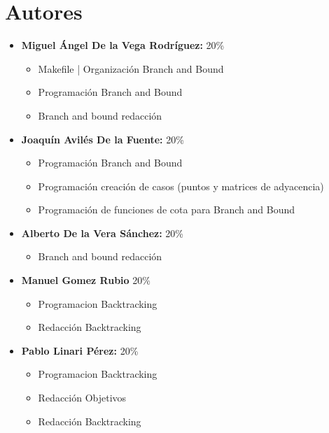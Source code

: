 \documentclass[11pt,openany]{book}
\begin{document}
\tableofcontents %
\newpage %


\chapter{Autores}
\begin{itemize}
      \item \textbf{Miguel Ángel De la Vega Rodríguez:} 20\%
            \begin{itemize}
                  \item Makefile | Organización Branch and Bound
                  \item Programación Branch and Bound
                  \item Branch and bound redacción
            \end{itemize}
      \item \textbf{Joaquín Avilés De la Fuente:} 20\%
            \begin{itemize}
                  \item Programación Branch and Bound
                  \item Programación creación de casos (puntos y matrices de adyacencia)
                  \item Programación de funciones de cota para Branch and Bound
            \end{itemize}
      \item \textbf{Alberto De la Vera Sánchez: } 20\%
            \begin{itemize}
                  \item Branch and bound redacción
            \end{itemize}
      \item \textbf{Manuel Gomez Rubio} 20\%
            \begin{itemize}
                \item Programacion Backtracking
                \item Redacción Backtracking
            \end{itemize}
      \item \textbf{Pablo Linari Pérez:} 20\%
            \begin{itemize}
                  \item Programacion Backtracking
                  \item Redacción Objetivos
                  \item Redacción Backtracking
            \end{itemize}
\end{itemize}
\end{document}
